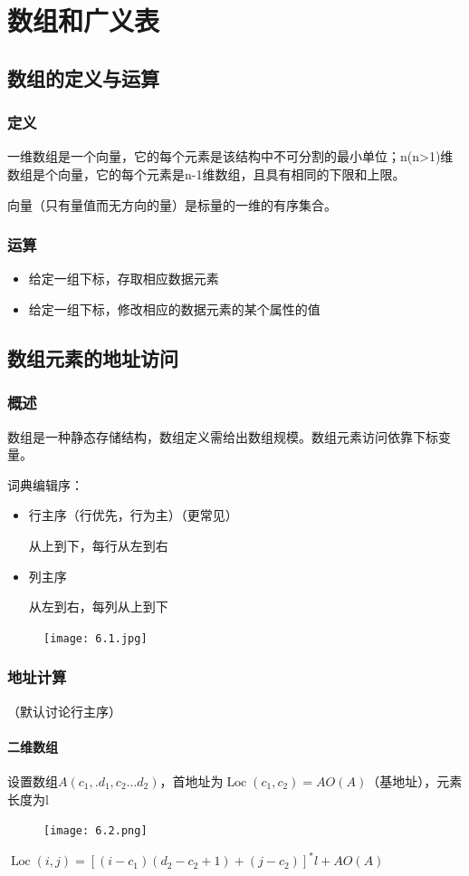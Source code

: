 \documentclass[AutoFakeBold]{LZUThesis2007}
\begin{document}
\chapter{数组和广义表}
	\section{数组的定义与运算}
		\subsection{定义}

一维数组是一个向量，它的每个元素是该结构中不可分割的最小单位；n(n>1)维数组是个向量，它的每个元素是n-1维数组，且具有相同的下限和上限。

向量（只有量值而无方向的量）是标量的一维的有序集合。
		\subsection{运算}
\begin{itemize}
	\item 给定一组下标，存取相应数据元素
	\item 给定一组下标，修改相应的数据元素的某个属性的值
\end{itemize}
	\section{数组元素的地址访问}
		\subsection{概述}
	数组是一种静态存储结构，数组定义需给出数组规模。数组元素访问依靠下标变量。

	词典编辑序：
\begin{itemize}
	\item 行主序（行优先，行为主）（更常见）

从上到下，每行从左到右
	\item 列主序

从左到右，每列从上到下
\end{itemize}
\begin{figure}[H]
    \centering
    \texttt{[image: 6.1.jpg]}
    \label{fig_install_texlive}
\end{figure}


		\subsection{地址计算}
（默认讨论行主序）
			\subsubsection{二维数组}
设置数组$A\left(c_{1}, . d_{1}, c_{2} \dots d_{2}\right)$，首地址为$\operatorname{Loc}\left(c_{1}, c_{2}\right)=A O(A)$（基地址），元素长度为l
\begin{figure}[H]
    \centering
    \texttt{[image: 6.2.png]}
    \label{fig_install_texlive}
\end{figure}
$\operatorname{Loc}(i, j)=\left[\left(i-c_{1}\right)\left(d_{2}-c_{2}+1\right)+\left(j-c_{2}\right)\right]^{*} l+A O(A)$
\end{document}
